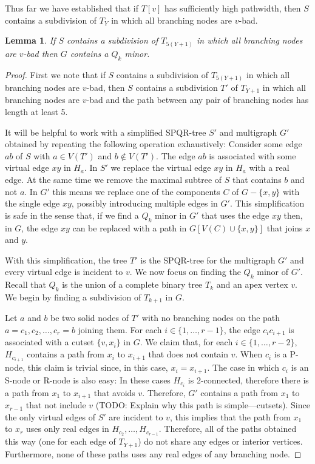 \documentclass[a4paper,11pt]{article}
\theoremstyle{plain}
\newtheorem{lemma}[theorem]{Lemma}
\theoremstyle{definition}
\begin{document}
Thus far we have established that if $T[v]$ has sufficiently high pathwidth, then $S$ contains a subdivision of $T_Y$ in which all branching nodes are $v$-bad.

\begin{lemma}
  If $S$ contains a subdivision of $T_{5(Y+1)}$ in which all branching nodes are  $v$-bad then $G$ contains a $Q_{k}$ minor.
\end{lemma}

\begin{proof}
  First we note that if $S$ contains a subdivision of $T_{5(Y+1)}$ in which
  all branching nodes are $v$-bad, then $S$ contains a subdivision $T'$
  of $T_{Y+1}$ in which all branching nodes are $v$-bad and the path
  between any pair of branching nodes has length at least 5.

  It will be helpful to work with a simplified SPQR-tree $S'$ and
  multigraph $G'$ obtained by repeating the following operation
  exhaustively: Consider some edge $ab$ of $S$ with $a\in V(T')$ and
  $b\not\in V(T')$. The edge $ab$ is associated with some virtual edge
  $xy$ in $H_a$.  In $S'$ we replace the virtual edge $xy$ in $H_a$
  with a real edge. At the same time we remove the maximal subtree of
  $S$ that contains $b$ and not $a$.  In $G'$ this means we replace
  one of the components $C$ of $G-\{x,y\}$ with the single edge $xy$,
  possibly introducing multiple edges in $G'$.  This simplification
  is safe in the sense that, if we find a $Q_k$ minor in $G'$
  that uses the edge $xy$ then, in $G$, the edge $xy$ can be replaced with a
  path in $G[V(C)\cup\{x,y\}]$ that joins $x$ and $y$.

  With this simplification, the tree $T'$ is the SPQR-tree for the
  multigraph $G'$ and every virtual edge is incident to $v$.  We now
  focus on finding the $Q_k$ minor of $G'$.  Recall that $Q_k$ is
  the union of a complete binary tree $T_k$ and an apex vertex $v$.
  We begin by finding a subdivision of $T_{k+1}$ in $G$.

  Let $a$ and $b$ be two solid nodes of $T'$ with no branching
  nodes on the path $a=c_1,c_2,\ldots,c_r=b$ joining them. For
  each $i\in\{1,\ldots,r-1\}$, the edge $c_ic_{i+1}$ is associated
  with a cutset $\{v,x_i\}$ in $G$.   We claim that, for each
  $i\in\{1,\ldots,r-2\}$, $H_{c_{i+1}}$ contains a path from $x_i$
  to $x_{i+1}$ that does not contain $v$.  When $c_i$
  is a P-node, this claim is trivial since, in this case, $x_i=x_{i+1}$.
  The case in which $c_i$ is an S-node or R-node is also easy: In these
  cases $H_{c_i}$ is 2-connected, therefore there is a path from $x_1$
  to $x_{i+1}$ that avoids $v$.  
  Therefore, $G'$ contains a path from
  $x_1$ to $x_{r-1}$ that not include $v$ (TODO: Explain why this path is simple---cutsets).  Since the only virtual
  edges of $S'$ are incident to $v$, this implies that the path from
  $x_1$ to $x_r$ uses only real edges in $H_{c_2},\ldots,H_{c_{r-1}}$.
  Therefore, all of the paths obtained this way (one for each edge of
  $T_{Y+1}$) do not share any edges or interior vertices. Furthermore,
  none of these paths uses any real edges of any branching node.
  

\end{proof}
\end{document}
